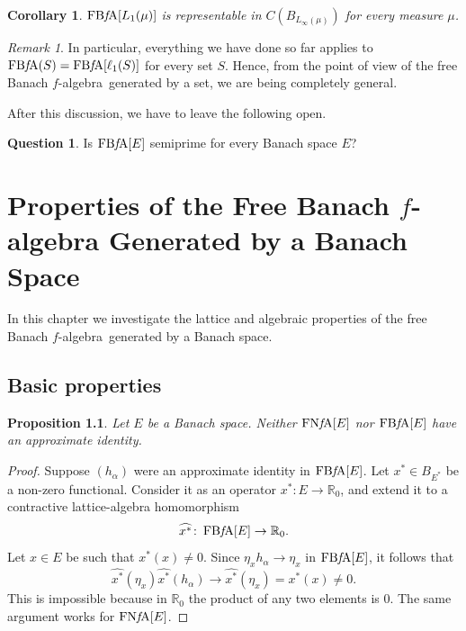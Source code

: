 \documentclass{memo-l}
\newtheorem{prop}[theorem]{Proposition}
\newtheorem{cor}[theorem]{Corollary}
\theoremstyle{definition}
\newtheorem{question}[theorem]{Question}
\theoremstyle{remark}
\newtheorem{rem}[theorem]{Remark}
\numberwithin{section}{chapter}
\numberwithin{equation}{chapter}
\newcommand\R{\ensuremath{\mathbb{R}}}
\newcommand{\el}[1]{\ensuremath{\ell_{#1}}}
\newcommand{\falg}{$f\!$-algebra}
\newcommand{\FNFA}[1]{\operatorname{FN{\it f}\!A}[#1]}
\newcommand{\FBFA}[1]{\operatorname{FB{\it f}\!A}[#1]}
\newcommand{\FBFAs}[1]{\operatorname{FB{\it f}\!A}(#1)}
\begin{document}
\begin{cor}
    $\FBFA{L_1(\mu )}$ is representable in $C(B_{L_\infty (\mu )})$
    for every measure $\mu $.
\end{cor}

\begin{rem}
    In particular, everything we have
    done so far applies to $\FBFAs S=\FBFA{\el 1(S)}$ for every set
    $S$. Hence, from the point of view of the free Banach \falg\
    generated by a set, we are being completely general.
\end{rem}

After this discussion, we have to leave the following open.

\begin{question}
    Is $\FBFA E$ semiprime for every Banach space $E$?
\end{question}

\chapter[Properties of the free Banach $f$-algebra]{Properties of the Free Banach \texorpdfstring{$f$-algebra}{f-algebra} Generated by a
Banach Space}
\label{sec:properties}

In this chapter we investigate the lattice and algebraic properties of the
free Banach \falg\ generated by a Banach space.

\section{Basic properties}

\begin{prop}
    Let $E$ be a Banach space. Neither $\FNFA E$ nor $\FBFA E$ have an
    approximate identity.
\end{prop}
\begin{proof}
    Suppose $(h_\alpha )$ were an approximate identity in $\FBFA E$.
    Let $x^{*} \in B_{E^{*}}$ be a non-zero functional. Consider it as
    an operator $x^{*}\colon E\to \R_0$, and extend it to a contractive
    lattice-algebra homomorphism
    \[
        \widehat{x^{*}}\colon \FBFA E\to \R_0.
    \]
    Let $x \in E$ be such that $x^{*}(x)\neq 0$. Since $\eta _x
    h_\alpha \to \eta _x$ in $\FBFA E$, it follows
    that
    \[
        \widehat{x^{*}}(\eta _x) \widehat{x^{*}}(h_\alpha )\to
        \widehat{x^{*}}(\eta _x)=x^{*}(x)\neq 0.
    \]
    This is impossible
    because in $\R_0$ the product of any two elements is 0. The same
    argument works for $\FNFA E$.
\end{proof}
\end{document}
